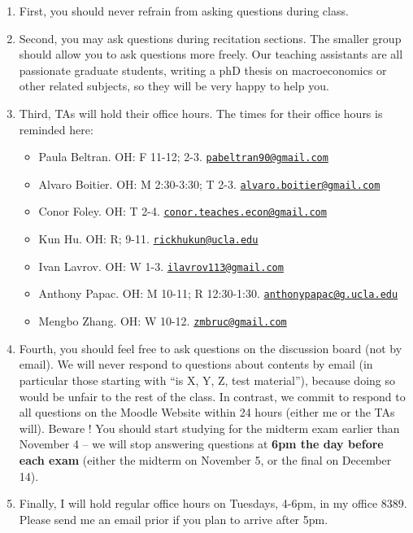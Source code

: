\documentclass[]{book}
\providecommand{\tightlist}{%
  \setlength{\itemsep}{0pt}\setlength{\parskip}{0pt}}
\theoremstyle{definition}
\theoremstyle{definition}
\theoremstyle{definition}
\theoremstyle{remark}
\begin{document}
\begin{enumerate}
\def\labelenumi{\arabic{enumi}.}
\item
  First, you should never refrain from asking questions during class.
\item
  Second, you may ask questions during recitation sections. The smaller
  group should allow you to ask questions more freely. Our teaching
  assistants are all passionate graduate students, writing a phD thesis
  on macroeconomics or other related subjects, so they will be very
  happy to help you.
\item
  Third, TAs will hold their office hours. The times for their office
  hours is reminded here:

  \begin{itemize}
  \tightlist
  \item
    Paula Beltran. OH: F 11-12; 2-3.
    \href{mailto:pabeltran90@gmail.com}{\nolinkurl{pabeltran90@gmail.com}}
  \item
    Alvaro Boitier. OH: M 2:30-3:30; T 2-3.
    \href{mailto:alvaro.boitier@gmail.com}{\nolinkurl{alvaro.boitier@gmail.com}}
  \item
    Conor Foley. OH: T 2-4.
    \href{mailto:conor.teaches.econ@gmail.com}{\nolinkurl{conor.teaches.econ@gmail.com}}
  \item
    Kun Hu. OH: R; 9-11.
    \href{mailto:rickhukun@ucla.edu}{\nolinkurl{rickhukun@ucla.edu}}
  \item
    Ivan Lavrov. OH: W 1-3.
    \href{mailto:ilavrov113@gmail.com}{\nolinkurl{ilavrov113@gmail.com}}
  \item
    Anthony Papac. OH: M 10-11; R 12:30-1:30.
    \href{mailto:anthonypapac@g.ucla.edu}{\nolinkurl{anthonypapac@g.ucla.edu}}
  \item
    Mengbo Zhang. OH: W 10-12.
    \href{mailto:zmbruc@gmail.com}{\nolinkurl{zmbruc@gmail.com}}
  \end{itemize}
\item
  Fourth, you should feel free to ask questions on the discussion board
  (not by email). We will never respond to questions about contents by
  email (in particular those starting with ``is X, Y, Z, test
  material''), because doing so would be unfair to the rest of the
  class. In contrast, we commit to respond to all questions on the
  Moodle Website within 24 hours (either me or the TAs will). Beware !
  You should start studying for the midterm exam earlier than November 4
  -- we will stop answering questions at \textbf{6pm the day before each
  exam} (either the midterm on November 5, or the final on December 14).
\item
  Finally, I will hold regular office hours on Tuesdays, 4-6pm, in my
  office 8389. Please send me an email prior if you plan to arrive after
  5pm.
\end{enumerate}
\end{document}
